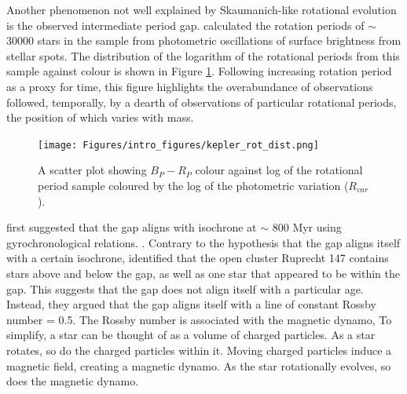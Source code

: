 Another phenomenon not well explained by Skaumanich-like rotational evolution is the observed intermediate period gap.
\citet{mcquillan_rotation_2014} calculated the rotation periods of $\sim$30000 stars in the \kepler{} sample from photometric oscillations of surface brightness from stellar spots.
The distribution of the logarithm of the rotational periods from this sample against colour is shown in Figure \ref{fig:kepler_rot_period}. 
Following increasing rotation period as a proxy for time, this figure highlights the overabundance of observations followed, temporally, by a dearth of observations of particular rotational periods, the position of which varies with mass.

\begin{figure}[h]
    \texttt{[image: Figures/intro\_figures/kepler\_rot\_dist.png]}
    \caption[The rotational period distribution of the \citet{mcquillan_rotation_2014} sample featuring the intermediate period gap.]{A scatter plot showing \gaia{} $B_P-R_P$ colour against log of the \kepler{} \citet{mcquillan_rotation_2014} rotational period sample coloured by the log of the photometric variation ($R_{var}$).
    }
    \label{fig:kepler_rot_period}
\end{figure}


\citet{reinhold_transition_2019} first suggested that the gap aligns with isochrone at $\sim$ 800 Myr using \citet{barnes_simple_2010} gyrochronological relations.
.
Contrary to the hypothesis that the gap aligns itself with a certain isochrone, \citet{curtis_when_2020} identified that the open cluster Ruprecht 147 contains stars above and below the gap, as well as one star that appeared to be within the gap.
This suggests that the gap does not align itself with a particular age.
Instead, they argued that the gap aligns itself with a line of constant Rossby number = 0.5.
The Rossby number is associated with the magnetic dynamo, \citep[see, e.g.,][]{noyes_rotation_1984, montesinos_new_2001, augustson_rossby_2019}
To simplify, a star can be thought of as a volume of charged particles.
As a star rotates, so do the charged particles within it.
Moving charged particles induce a magnetic field, creating a magnetic dynamo.
As the star rotationally evolves, so does the magnetic dynamo.


